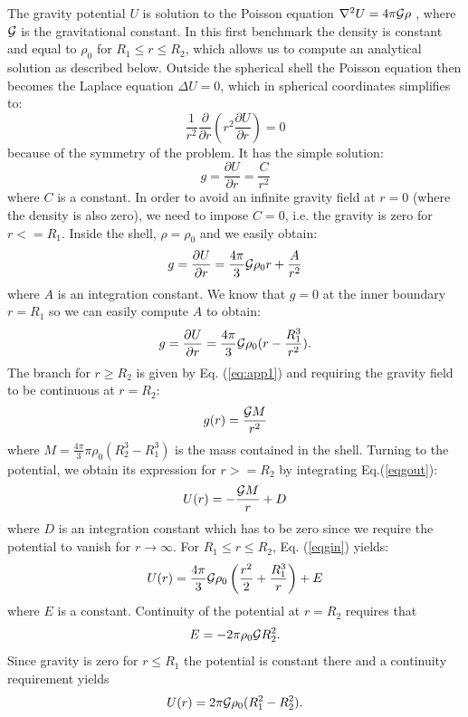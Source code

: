 The gravity potential $U$ is solution to the Poisson equation 
${\mathbf \nabla}^2 U = 4\pi {\cal G} \rho$ \cite{TS14}, where ${\cal G}$ is the gravitational constant.
In this first benchmark the density is constant and equal to $\rho_0$ for $R_1\leq r \leq R_2$, which allows us to compute an analytical solution as described below.
Outside the spherical shell the Poisson equation then becomes the Laplace equation $\Delta U=0$, which in spherical coordinates simplifies to: 
\begin{equation}
\frac{1}{r^2} \frac{\partial }{\partial r} \left(r^2 \frac{\partial U}{\partial r} \right) = 0 
\end{equation}
because of the symmetry of the problem. It has the simple solution:
\begin{equation}
g=\frac{\partial U}{\partial r} = \frac{C}{r^2} \label{eq:app1}
\end{equation}
where $C$ is a constant.
In order to avoid an infinite gravity field at $r=0$ (where the density is also zero), we need to impose $C=0$, i.e. the 
gravity is zero for $r<=R_1$.
Inside the shell, $\rho=\rho_0$ and we easily obtain:
\begin{equation}
g=\frac{\partial U}{\partial r} = \frac{4 \pi}{3} {\cal G} \rho_0 r + \frac{A}{r^2}
\end{equation}
where $A$ is an integration constant. 
We know that $g=0$ at the inner boundary $r=R_1$ so we can easily compute $A$ to obtain:
\begin{equation}
g=\frac{\partial U}{\partial r} = \frac{4 \pi}{3} {\cal G} \rho_0 (r - \frac{R_1^3}{r^2}). \label{eqgin}
\end{equation}
The branch for $r\geq R_2$ is given by Eq. (\ref{eq:app1}) and requiring the gravity field to be continuous at $r=R_2$:
\begin{equation}
g(r) = \frac{{\cal G} M}{r^2} \label{eqgout}
\end{equation}
where $M=\frac{4\pi}{3}\pi\rho_0(R_2^3-R_1^3)$ is the mass contained in the shell.
Turning to the potential, we obtain its expression for $r>=R_2$ by integrating Eq.(\ref{eqgout}):
\begin{equation}
U(r)=-\frac{{\cal G}M}{r} +D
\end{equation}
where $D$ is an integration constant which has to be zero since we require the potential to vanish for $r\rightarrow \infty$.
For $R_1\leq r \leq R_2$, Eq. (\ref{eqgin}) yields:
\begin{equation}
U(r)= \frac{4 \pi}{3} {\cal G} \rho_0 \left(\frac{r^2}{2} + \frac{R_1^3}{r} \right)  + E 
\end{equation}
where $E$ is a constant. Continuity of the potential at $r=R_2$ requires that
\begin{equation}
E=-2\pi\rho_0 {\cal G}R_2^2.
\end{equation}
Since gravity is zero for $r\leq R_1$ the potential is constant there and a continuity requirement yields
\begin{equation}
U(r)=2\pi {\cal G}\rho_0 (R_1^2-R_2^2).
\end{equation}

